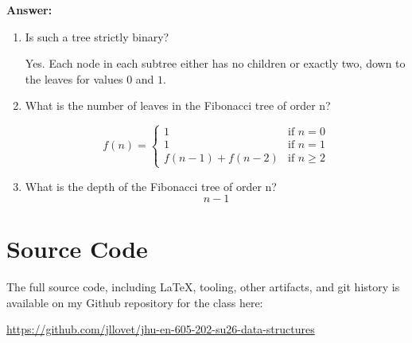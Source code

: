 \documentclass[10pt,letterpaper,final]{report}
\begin{document}
\medskip
\noindent\textbf{Answer:}
\medskip

\begin{enumerate}
  \item Is such a tree strictly binary?
  
  Yes. Each node in each subtree either has no children or exactly two, down to the leaves for values $0$ and $1$.
  
  \item What is the number of leaves in the Fibonacci tree of order n?
  
  \[
  f(n) =
  \begin{cases}
    1       & \text{if } n = 0 \\
    1       & \text{if } n = 1 \\
    f(n-1) + f(n-2) & \text{if } n \ge 2
  \end{cases}
\]
  \item What is the depth of the Fibonacci tree of order n?
  \[
  n-1
  \]
\end{enumerate}

\pagebreak

\section*{Source Code}
The full source code, including LaTeX, tooling, other artifacts, and git history is available on my Github repository for the class here:
\begin{center}
  \url{https://github.com/jllovet/jhu-en-605-202-su26-data-structures}
\end{center}

\printbibliography
\end{document}
